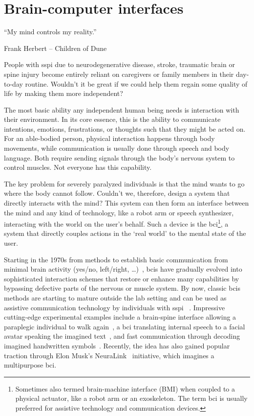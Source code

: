 \chapter{Brain-computer interfaces}
\label{sec:bci}
\epigraph{``My mind controls my reality.''}{Frank Herbert -- Children of Dune}

People with \ac{sspi} due to neurodegenerative disease, stroke, traumatic brain or spine
injury become entirely reliant on caregivers or family members in their day-to-day
routine.
Wouldn't it be great if we could help them regain some quality of life by making them
more independent?

The most basic ability any independent human being needs is interaction with their
environment.
In its core essence, this is the ability to communicate intentions, emotions,
frustrations, or thoughts such that they might be acted on.
For an able-bodied person, physical interaction happens through body movements, while
communication is usually done through speech and body language.
Both require sending signals through the body's nervous system to control muscles.
Not everyone has this capability.

The key problem for severely paralyzed individuals is that the mind wants to go where the
body cannot follow.
Couldn't we, therefore, design a system that directly interacts with the mind?
This system can then form an interface between the mind and any kind of technology, like
a robot arm or speech synthesizer, interacting with the world on the user's behalf.
Such a device is the \ac{bci}\footnote{Sometimes also termed brain-machine interface
(BMI) when coupled to a physical actuator, like a robot arm or an exoskeleton.
The term \ac{bci} is usually preferred for assistive technology and communication
devices.}, a system that directly couples actions in the `real world' to the mental state
of the user.

Starting in the 1970s from methods to establish basic communication from minimal brain
activity (yes/no, left/right, \ldots)~\cite{Wolpaw2002}, \acp{bci} have gradually evolved
into sophisticated interaction schemes that restore or enhance many capabilities by
bypassing defective parts of the nervous or muscle system.
By now, classic \acp{bci} methods are starting to mature outside the lab setting and can
be used as assistive communication technology by individuals with \acl{sspi}
~\cite{Wolpaw2018,Milekovic2018}.
Impressive cutting-edge experimental examples include a brain-spine interface allowing a
paraplegic individual to walk again~\cite{Lorach2023}, a \ac{bci} translating internal
speech to a facial avatar speaking the imagined text~\cite{Metzger2023}, and fast
communication through decoding imagined handwritten symbols~\cite{Willett2021}.
Recently, the idea has also gained popular traction through Elon Musk's
NeuraLink~\cite{Musk2019} initiative, which imagines a multipurpose \ac{bci}.

